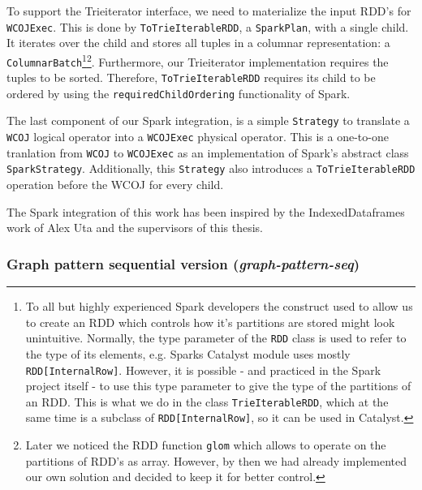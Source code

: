 To support the Trieiterator interface, we need to materialize the input RDD's for \texttt{WCOJExec}.  %
This is done by \texttt{ToTrieIterableRDD}, a \texttt{SparkPlan}, with a single child.
It iterates over the child and stores all tuples in a columnar representation: a \texttt{ColumnarBatch}\footnote{To all but highly
experienced Spark developers the construct used to allow us to create an RDD which controls how it's partitions are stored might look
unintuitive.
Normally, the type parameter of the \texttt{RDD} class is used to refer to the type of its elements, e.g. Sparks Catalyst module uses
mostly \texttt{RDD[InternalRow]}.
However, it is possible - and practiced in the Spark project itself - to use this type parameter to give the type of the partitions of an
RDD.
This is what we do in the class \texttt{TrieIterableRDD}, which at the same time is a subclass of \texttt{RDD[InternalRow]}, so it can be
used in Catalyst.}\footnote{Later we noticed the RDD function \texttt{glom} which allows to operate on the partitions of RDD's as array.
However, by then we had already implemented our own solution and decided to keep it for better control.}.
Furthermore, our Trieiterator implementation requires the tuples to be sorted.
Therefore, \texttt{ToTrieIterableRDD} requires its child to be ordered by using the \texttt{requiredChildOrdering} functionality of Spark.

The last component of our Spark integration, is a simple \texttt{Strategy} to translate a \texttt{WCOJ} logical operator into a
\texttt{WCOJExec} physical operator.
This is a one-to-one tranlation from \texttt{WCOJ} to \texttt{WCOJExec} as an implementation of Spark's abstract class
\texttt{SparkStrategy}.
Additionally, this \texttt{Strategy} also introduces a \texttt{ToTrieIterableRDD} operation before the WCOJ for every child.

The Spark integration of this work has been inspired by the IndexedDataframes~\cite{indexed-dataframes} work of Alex Uta and the supervisors
of this thesis.


\subsubsection{Graph pattern sequential version (\textit{graph-pattern-seq})}
